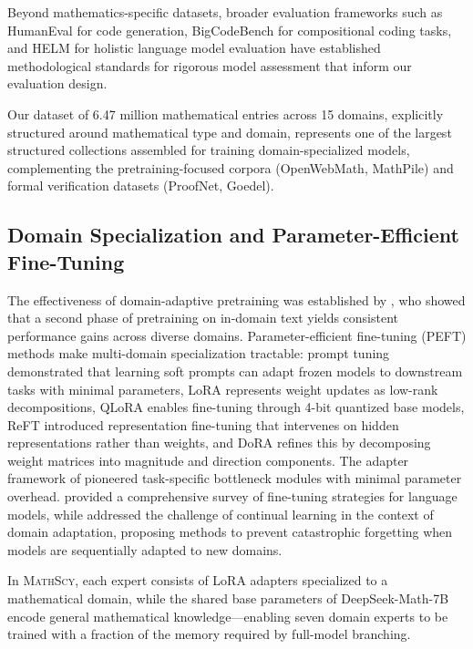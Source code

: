 \documentclass[11pt,a4paper]{article}
\newcommand{\mathscy}{\textsc{MathScy}}
\begin{document}
Beyond mathematics-specific datasets, broader evaluation frameworks such as HumanEval \citep{chen2021evaluating} for code generation, BigCodeBench \citep{zhuo2024bigcodebench} for compositional coding tasks, and HELM \citep{liang2023holistic} for holistic language model evaluation have established methodological standards for rigorous model assessment that inform our evaluation design.

Our dataset of 6.47 million mathematical entries across 15 domains, explicitly structured around mathematical type and domain, represents one of the largest structured collections assembled for training domain-specialized models, complementing the pretraining-focused corpora (OpenWebMath, MathPile) and formal verification datasets (ProofNet, Goedel).

\subsection{Domain Specialization and Parameter-Efficient Fine-Tuning}

The effectiveness of domain-adaptive pretraining was established by \cite{gururangan2020dont}, who showed that a second phase of pretraining on in-domain text yields consistent performance gains across diverse domains. Parameter-efficient fine-tuning (PEFT) methods make multi-domain specialization tractable: prompt tuning \citep{lester2021power} demonstrated that learning soft prompts can adapt frozen models to downstream tasks with minimal parameters, LoRA \citep{hu2022lora} represents weight updates as low-rank decompositions, QLoRA \citep{dettmers2023qlora} enables fine-tuning through 4-bit quantized base models, ReFT \citep{luong2024reft} introduced representation fine-tuning that intervenes on hidden representations rather than weights, and DoRA \citep{liu2024dora} refines this by decomposing weight matrices into magnitude and direction components. The adapter framework of \cite{houlsby2019parameter} pioneered task-specific bottleneck modules with minimal parameter overhead. \citet{scialom2022fine} provided a comprehensive survey of fine-tuning strategies for language models, while \citet{gupta2023continual} addressed the challenge of continual learning in the context of domain adaptation, proposing methods to prevent catastrophic forgetting when models are sequentially adapted to new domains.

In \mathscy{}, each expert consists of LoRA adapters specialized to a mathematical domain, while the shared base parameters of DeepSeek-Math-7B encode general mathematical knowledge---enabling seven domain experts to be trained with a fraction of the memory required by full-model branching.
\end{document}
